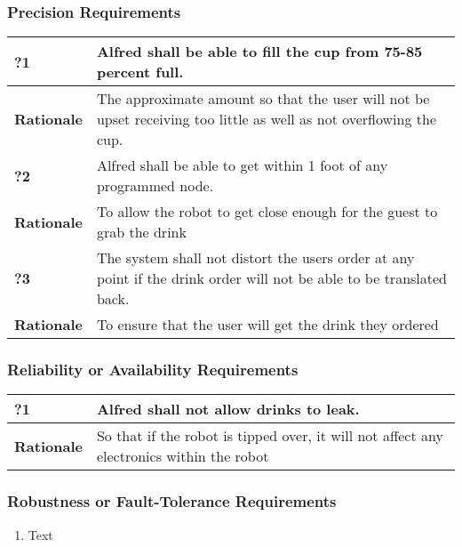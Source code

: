 \documentclass [11pt]{article}
\begin{document}
\subsubsection{Precision Requirements}

\begin{longtable}{| p{ } | p{ } | }\hline 
	\rowcolor{tableCell}\textbf{?1} & Alfred shall be able to fill the cup from 75-85 percent full. \\ \hline
	\textbf{Rationale} & The approximate amount so that the user will not be upset receiving too little as well as not overflowing the cup.\\ \hline 
	\rowcolor{tableCell}\textbf{?2} & Alfred shall be able to get within 1 foot of any programmed node. \\ \hline
	\textbf{Rationale} & To allow the robot to get close enough for the guest to grab the drink\\ \hline 
	\rowcolor{tableCell}\textbf{?3} & The system shall not distort the users order at any point if the drink order will not be able to be translated back. \\ \hline
	\textbf{Rationale} & To ensure that the user will get the drink they ordered\\ \hline	
\end{longtable}
\subsubsection{Reliability or Availability Requirements}

\begin{longtable}{| p{ } | p{ } | }\hline 
	\rowcolor{tableCell}\textbf{?1} &  Alfred shall not allow drinks to leak. \\ \hline
	\textbf{Rationale} & So that if the robot is tipped over, it will not affect any electronics within the robot\\ \hline 
\end{longtable}
\subsubsection{Robustness or Fault-Tolerance Requirements }
	\begin{enumerate}[label=\textbf{(\roman*)}]
		\item Text
	\end{enumerate}
\end{document}
